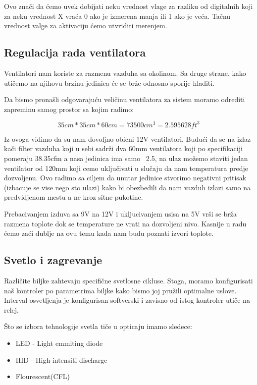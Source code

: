 \documentclass[a4paper,11pt]{book}
\begin{document}
Ovo znači da ćemo uvek dobijati neku vrednost vlage za razliku od digitalnih koji za neku vrednost X vraća 0 ako je izmerena manja ili 1 ako je veća. Tačnu vrednost valge za aktivaciju ćemo utvriditi merenjem.

\subsection{Regulacija rada ventilatora}
Ventilatori nam koriste za razmenu vazduha sa okolinom. Sa druge strane, kako utičemo na njihovu brzinu jedinica će se brže odnosno sporije hladiti.

Da bismo pronašli odgovarajuću veličinu ventilatora za sistem moramo odrediti zapreminu samog prostor sa kojim radimo:

\[ 35cm * 35cm * 60cm =  73500cm^3 = 2.595628ft^3\]

Iz ovoga vidimo da su nam dovoljno obicni 12V ventilatori. Budući da se na izlaz kači filter vazduha koji u sebi sadrži dva 60mm ventilatora koji po specifikaciji pomeraju 38.35cfm a nasa jedinica ima samo ~2.5, na ulaz možemo staviti jedan ventilator od 120mm koji cemo uključivati u slučaju da nam temperatura predje dozvoljenu. Ovo radimo sa ciljem da unutar jedinice stvorimo negativni pritisak (izbacuje se vise nego sto ulazi) kako bi obezbedili da nam vazduh izlazi samo na predvidjenom mestu a ne kroz sitne pukotine.

\noindent Prebacivanjem izduva sa 9V na 12V i ukljucivanjem usisa na 5V vrši se brža razmena toplote dok se temperature ne vrati na dozvoljeni nivo. Kasnije u radu ćemo zaći dublje na ovu temu kada nam budu poznati izvori toplote.


\subsection{Svetlo i zagrevanje}
Različite biljke zahtevaju specifične svetlosne cikluse. Stoga, moramo konfigurisati naš kontroler po parametrima biljke kako bismo joj pružili optimalne uslove. Interval osvetljenja je konfigurisan softverski i zavisno od istog kontroler utiče na relej. 

Što se izbora tehnologije svetla tiče u opticaju imamo sledece:

\begin{itemize}
  \item LED - Light emmiting diode
  \item HID - High-intensiti discharge
  \item Flourescent(CFL)
\end{itemize}
\end{document}
